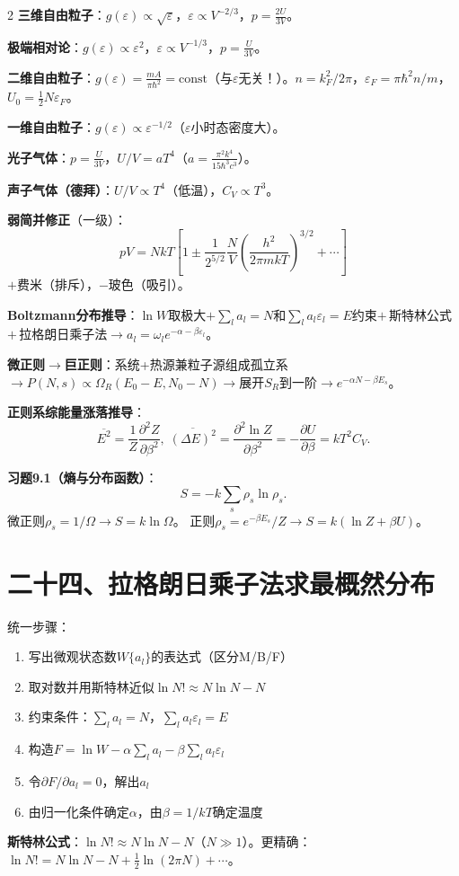 \documentclass[10pt,a4paper,fontset=mac]{ctexart}
\newcommand{\đ}{\mathrm{đ}}
\begin{document}
\begin{multicols}{2}
\textbf{三维自由粒子}：$g(\varepsilon)\propto\sqrt{\varepsilon}$，$\varepsilon\propto V^{-2/3}$，$p=\frac{2U}{3V}$。

\textbf{极端相对论}：$g(\varepsilon)\propto\varepsilon^2$，$\varepsilon\propto V^{-1/3}$，$p=\frac{U}{3V}$。

\textbf{二维自由粒子}：$g(\varepsilon)=\frac{mA}{\pi\hbar^2}=\text{const}$（与$\varepsilon$无关！）。$n=k_F^2/2\pi$，$\varepsilon_F=\pi\hbar^2n/m$，$U_0=\frac{1}{2}N\varepsilon_F$。

\textbf{一维自由粒子}：$g(\varepsilon)\propto\varepsilon^{-1/2}$（$\varepsilon$小时态密度大）。

\textbf{光子气体}：$p=\frac{U}{3V}$，$U/V=aT^4$（$a=\frac{\pi^2k^4}{15\hbar^3c^3}$）。

\textbf{声子气体（德拜）}：$U/V\propto T^4$（低温），$C_V\propto T^3$。

\textbf{弱简并修正}（一级）：
\[
pV=NkT\!\left[1\pm\frac{1}{2^{5/2}}\frac{N}{V}\!\left(\frac{h^2}{2\pi mkT}\right)^{3/2}+\cdots\right]
\]
$+$费米（排斥），$-$玻色（吸引）。

\textbf{Boltzmann分布推导}：$\ln W$取极大$+\sum_l a_l=N$和$\sum_l a_l\varepsilon_l=E$约束$+\,$斯特林公式$+\,$拉格朗日乘子法$\to a_l=\omega_le^{-\alpha-\beta\varepsilon_l}$。

\textbf{微正则$\to$巨正则}：系统+热源兼粒子源组成孤立系$\to P(N,s)\propto\Omega_R(E_0-E,N_0-N)\to$展开$S_R$到一阶$\to e^{-\alpha N-\beta E_s}$。

\textbf{正则系综能量涨落推导}：
\[
\overline{E^2}=\frac{1}{Z}\frac{\partial^2Z}{\partial\beta^2},\;
\overline{(\Delta E)^2}=\frac{\partial^2\ln Z}{\partial\beta^2}=-\frac{\partial U}{\partial\beta}=kT^2C_V.
\]

\textbf{习题9.1（熵与分布函数）}：
\[
S=-k\sum_s\rho_s\ln\rho_s.
\]
微正则$\rho_s=1/\Omega\to S=k\ln\Omega$。
正则$\rho_s=e^{-\beta E_s}/Z\to S=k(\ln Z+\beta U)$。

\section*{二十四、拉格朗日乘子法求最概然分布}

统一步骤：
\begin{enumerate}
\item 写出微观状态数$W\{a_l\}$的表达式（区分M/B/F）
\item 取对数并用斯特林近似$\ln N!\approx N\ln N-N$
\item 约束条件：$\sum_l a_l=N$，$\sum_l a_l\varepsilon_l=E$
\item 构造$F=\ln W-\alpha\sum_l a_l-\beta\sum_l a_l\varepsilon_l$
\item 令$\partial F/\partial a_l=0$，解出$a_l$
\item 由归一化条件确定$\alpha$，由$\beta=1/kT$确定温度
\end{enumerate}

\textbf{斯特林公式}：$\ln N!\approx N\ln N-N$（$N\gg1$）。更精确：$\ln N!=N\ln N-N+\frac{1}{2}\ln(2\pi N)+\cdots$。

\end{multicols}
\end{document}
